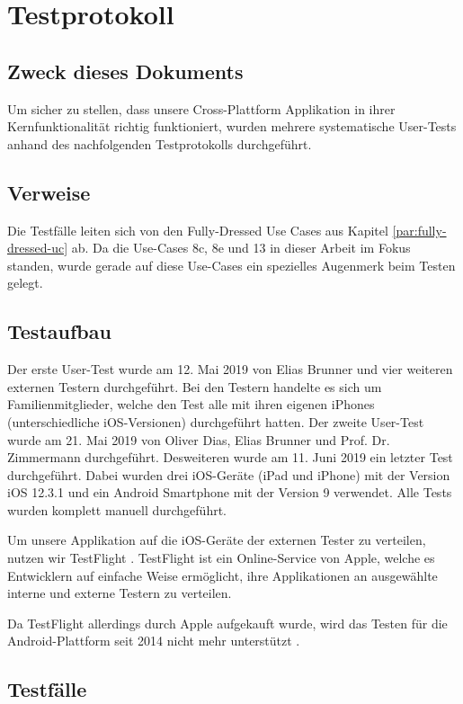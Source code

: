 \section{Testprotokoll}
\subsection{Zweck dieses Dokuments}
Um sicher zu stellen, dass unsere Cross-Plattform Applikation in ihrer Kernfunktionalität richtig funktioniert, wurden mehrere systematische User-Tests anhand des nachfolgenden Testprotokolls durchgeführt.

\subsection{Verweise}
Die Testfälle leiten sich von den Fully-Dressed Use Cases aus Kapitel \ref{par:fully-dressed-uc} ab. Da die Use-Cases 8c, 8e und 13 in dieser Arbeit im Fokus standen, wurde gerade auf diese Use-Cases ein spezielles Augenmerk beim Testen gelegt.

\subsection{Testaufbau}
Der erste User-Test wurde am 12. Mai 2019 von Elias Brunner und vier weiteren externen Testern durchgeführt. Bei den Testern handelte es sich um Familienmitglieder, welche den Test alle mit ihren eigenen iPhones (unterschiedliche iOS-Versionen) durchgeführt hatten.
Der zweite User-Test wurde am 21. Mai 2019 von Oliver Dias, Elias Brunner und Prof. Dr. Zimmermann durchgeführt. Desweiteren wurde am 11. Juni 2019 ein letzter Test durchgeführt. Dabei wurden drei iOS-Geräte (iPad und iPhone) mit der Version iOS 12.3.1 und ein Android Smartphone mit der Version 9 verwendet. 
Alle Tests wurden komplett manuell durchgeführt.

Um unsere Applikation auf die iOS-Geräte der externen Tester zu verteilen, nutzen wir TestFlight \cite{testflight}. TestFlight ist ein Online-Service von Apple, welche es Entwicklern auf einfache Weise ermöglicht, ihre Applikationen an ausgewählte interne und externe Testern zu verteilen. 

Da TestFlight allerdings durch Apple aufgekauft wurde, wird das Testen für die Android-Plattform seit 2014 nicht mehr unterstützt \cite{testflightWikipedia}. 

\subsection{Testfälle}

